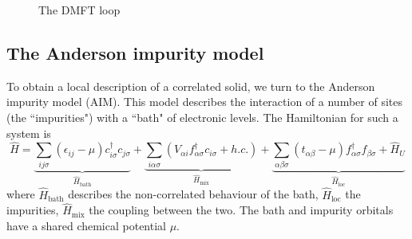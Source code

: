 \documentclass[10pt,a4paper,final]{article}
\begin{document}
\begin{figure}[!t]
{
}
   \caption{The DMFT loop}
   \label{fig:DMFT_loop}
\end{figure}

\FloatBarrier
\subsection{The Anderson impurity model}
To obtain a local description of a correlated solid, we turn to the Anderson impurity model (AIM). This model describes the interaction of a number of sites (the ``impurities") with a ``bath" of electronic levels. The Hamiltonian for such a system is
%
\begin{equation}
\hat H =
\underbrace{\sum_{ij\sigma} (\epsilon_{ij}-\mu) c^\dag_{i\sigma} c_{j\sigma}}_{\hat H_\text{bath}}
+ \underbrace{\sum_{i\alpha\sigma} \left(V_{\alpha i}f^\dag_{\alpha\sigma} c_{i\sigma}
+ h.c.\right)}_{\hat H_\text{mix}}
+ \underbrace{
\sum_{\alpha\beta\sigma} (t_{\alpha\beta}-\mu)f^\dag_{\alpha\sigma}f_{\beta\sigma} + \hat H_{U}
}_{\hat H_\text{loc}}
\label{eqn:AIM_hamiltonian}
\end{equation}
%
where $\hat H_\text{bath}$ describes the non-correlated behaviour of the bath, $\hat H_\text{loc}$ the impurities, $\hat H_\text{mix}$ the coupling between the two. The bath and impurity orbitals have a shared chemical potential $\mu$.
\end{document}
